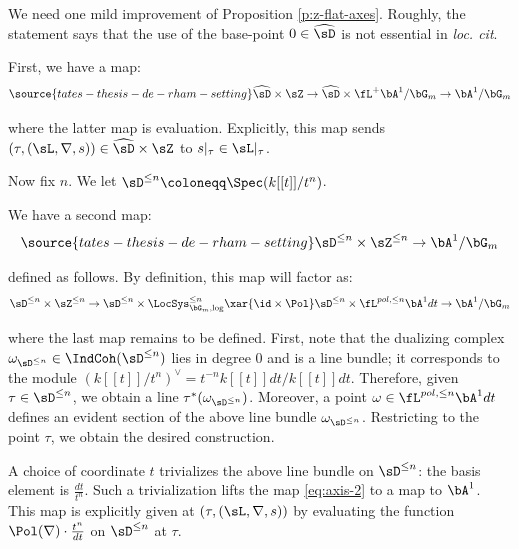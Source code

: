 \subsubsection{}\label{ss:c-redux}

We need one mild improvement of Proposition \ref{p:z-flat-axes}.
Roughly, the statement says that the use of the base-point $0 \in \widehat{\sD}$
is not essential in \emph{loc. cit}.

First, we have a map:
%
\begin{equation}\label{eq:axis-1}
\source{tates-thesis-de-rham-setting}
\widehat{\sD} \times \sZ \to \widehat{\sD} \times \fL^+\bA^1/\bG_m \to
\bA^1/\bG_m
\end{equation}

 where the latter map is evaluation. Explicitly, this map
sends $(\tau,(\sL,\nabla,s)) \in \widehat{\sD} \times \sZ$ to
$s|_{\tau} \in \sL|_{\tau}$.

Now fix $n$. We let $\sD^{\leq n} \coloneqq \Spec(k[[t]]/t^n)$.

We have a second map:
%
\begin{equation}\label{eq:axis-2}
\source{tates-thesis-de-rham-setting}
\sD^{\leq n} \times \sZ^{\leq n} \to \bA^1/\bG_m
\end{equation}

 defined as follows. By definition, this map will
factor as:
%
\[
\sD^{\leq n} \times \sZ^{\leq n} \to
\sD^{\leq n} \times \LocSys_{\bG_m,\log}^{\leq n} \xar{\id \times \Pol}
\sD^{\leq n} \times \fL^{pol,\leq n} \bA^1 dt \to
\bA^1/\bG_m
\]

 where the last map remains to be defined.
First, note that the dualizing complex
$\omega_{\sD^{\leq n}} \in \IndCoh(\sD^{\leq n})$ lies in degree $0$
and is a line bundle; it corresponds to the module $(k[[t]]/t^n)^{\vee} =
t^{-n} k[[t]]dt/k[[t]]dt$. Therefore, given $\tau \in \sD^{\leq n}$,
we obtain a line $\tau^*(\omega_{\sD^{\leq n}})$. Moreover,
a point $\omega \in \fL^{pol,\leq n} \bA^1 dt$ defines an evident section
of the above line bundle $\omega_{\sD^{\leq n}}$. Restricting to the
point $\tau$, we obtain the desired construction.

\begin{rem}
\notready

A choice of coordinate $t$ trivializes the above line bundle
on $\sD^{\leq n}$: the basis element is $\frac{dt}{t^n}$.
Such a trivialization lifts the map \eqref{eq:axis-2} to
a map to $\bA^1$. This map is explicitly given at
$(\tau,(\sL,\nabla,s))$ by evaluating the function
$\Pol(\nabla) \cdot \frac{t^n}{dt}$ on $\sD^{\leq n}$
at $\tau$.

\end{rem}

